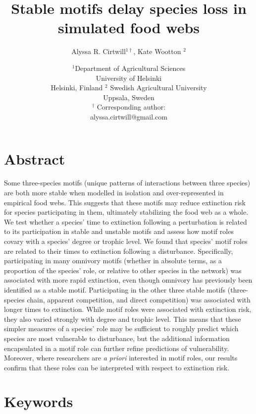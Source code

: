 \documentclass[12pt]{article}
\title{Stable motifs delay species loss in simulated food webs}
\author{Alyssa R. Cirtwill$^{1\dagger}$, Kate Wootton $^{2}$}
\date{\small$^1$Department of Agricultural Sciences\\ 
University of Helsinki\\
Helsinki, Finland
\medskip
\small$^2$ Swedish Agricultural University\\
Uppsala, Sweden\\
\medskip
$^\dagger$ Corresponding author:\\
alyssa.cirtwill@gmail.com\\
 }
\begin{document}
 
\maketitle 
\raggedright
\setlength{\parindent}{15pt} 

\clearpage
\linenumbers
\begin{spacing}{2.0}

\section*{Abstract} %
    Some three-species motifs (unique patterns of interactions between three species) are both more stable when modelled in isolation and over-represented in empirical food webs. This suggests that these motifs may reduce extinction risk for species participating in them, ultimately stabilizing the food web as a whole. 
    We test whether a species' time to extinction following a perturbation is related to its participation in stable and unstable motifs and assess how motif roles covary with a species' degree or trophic level.
    We found that species' motif roles are related to their times to extinction following a disturbance. Specifically, participating in many omnivory motifs (whether in absolute terms, as a proportion of the species' role, or relative to other species in the network) was associated with more rapid extinction, even though omnivory has previously been identified as a stable motif. Participating in the other three stable motifs (three-species chain, apparent competition, and direct competition) was associated with longer times to extinction.
    While motif roles were associated with extinction risk, they also varied strongly with degree and trophic level. This means that these simpler measures of a species' role may be sufficient to roughly predict which species are most vulnerable to disturbance, but the additional information encapsulated in a motif role can further refine predictions of vulnerability. Moreover, where researchers are \emph{a priori} interested in motif roles, our results confirm that these roles can be interpreted with respect to extinction risk.%

\section*{Keywords}


\end{spacing}
\end{document}
